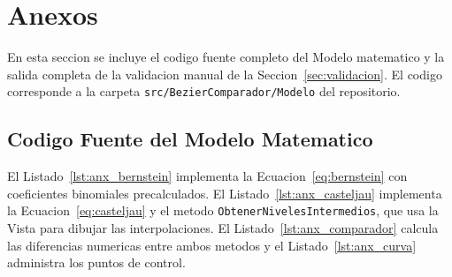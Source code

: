 \section{Anexos}
\label{sec:anexos}

En esta seccion se incluye el codigo fuente completo del Modelo matematico y la salida completa de la validacion manual de la Seccion~\ref{sec:validacion}. El codigo corresponde a la carpeta \texttt{src/BezierComparador/Modelo} del repositorio.

\subsection{Codigo Fuente del Modelo Matematico}
\label{subsec:anx_codigo}

El Listado~\ref{lst:anx_bernstein} implementa la Ecuacion~\ref{eq:bernstein} con coeficientes binomiales precalculados. El Listado~\ref{lst:anx_casteljau} implementa la Ecuacion~\ref{eq:casteljau} y el metodo \texttt{ObtenerNivelesIntermedios}, que usa la Vista para dibujar las interpolaciones. El Listado~\ref{lst:anx_comparador} calcula las diferencias numericas entre ambos metodos y el Listado~\ref{lst:anx_curva} administra los puntos de control.


